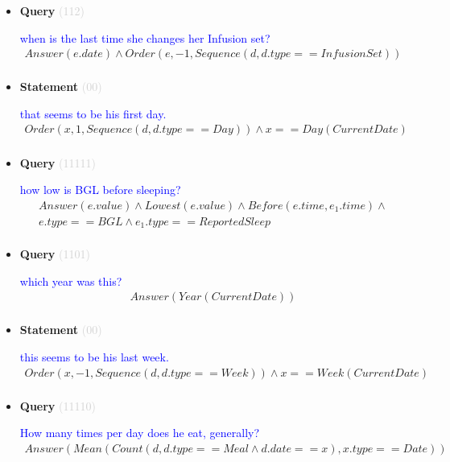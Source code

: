 \documentclass[11pt]{article}
\newcommand{\key}[1]{\textcolor{lightgray}{#1}}
\newcounter{CQuery}
\newcounter{CStatement}
\begin{document}
\begin{itemize}
\item
\textbf{Query\theCQuery} \key{(112)} \addtocounter{CQuery}{1}
\textcolor{blue}{ when is the last time she changes her Infusion set? }
\begin{multline*}
Answer(e.date) \wedge Order(e, -1, Sequence(d, d.type==InfusionSet)) \\ 
\end{multline*}


\item
\textbf{Statement\theCStatement} \key{(00)} \addtocounter{CStatement}{1}
\textcolor{blue}{ that seems to be his first day. }
\begin{multline*}
Order(x, 1, Sequence(d, d.type==Day)) \wedge x==Day(CurrentDate) \\ 
\end{multline*}


\item
\textbf{Query\theCQuery} \key{(11111)} \addtocounter{CQuery}{1}
\textcolor{blue}{ how low is BGL before sleeping? }
\begin{multline*}
Answer(e.value) \wedge Lowest(e.value) \wedge Before(e.time, e_1.time) \wedge \\ 
e.type==BGL \wedge e_1.type==ReportedSleep \\ 
\end{multline*}


\item
\textbf{Query\theCQuery} \key{(1101)} \addtocounter{CQuery}{1}
\textcolor{blue}{ which year was this? }
\begin{multline*}
Answer(Year(CurrentDate)) \\ 
\end{multline*}


\item
\textbf{Statement\theCStatement} \key{(00)} \addtocounter{CStatement}{1}
\textcolor{blue}{ this seems to be his last week. }
\begin{multline*}
Order(x, -1, Sequence(d, d.type==Week)) \wedge x==Week(CurrentDate) \\ 
\end{multline*}


\item
\textbf{Query\theCQuery} \key{(11110)} \addtocounter{CQuery}{1}
\textcolor{blue}{ How many times per day does he eat, generally? }
\begin{multline*}
Answer(Mean(Count(d, d.type==Meal \wedge d.date==x), x.type==Date)) \\ 
\end{multline*}



\end{itemize}
\end{document}
